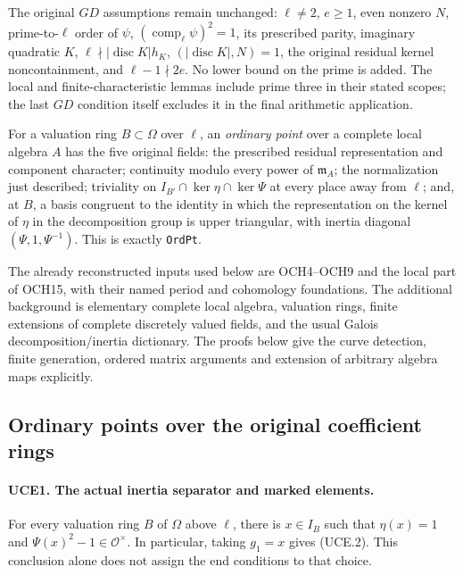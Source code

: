 \documentclass[11pt,a4paper]{article}
\numberwithin{equation}{section}
\theoremstyle{remark}\newtheorem{remark}[theorem]{Remark}
\begin{document}
The original \(GD\) assumptions remain unchanged: \(\ell\ne2\),
\(e\ge1\), even nonzero \(N\), prime-to-\(\ell\) order of
\(\psi\), \((\operatorname{comp}_\ell\psi)^2=1\), its prescribed
parity, imaginary quadratic \(K\),
\(\ell\nmid |\operatorname{disc}K|h_K\),
\((|\operatorname{disc}K|,N)=1\), the original residual kernel
noncontainment, and \(\ell-1\nmid2e\).  No lower bound on the prime
is added.  The local and finite-characteristic lemmas include prime
three in their stated scopes; the last \(GD\) condition itself excludes
it in the final arithmetic application.

For a valuation ring \(B\subset\Omega\) over \(\ell\), an
\emph{ordinary point} over a complete local algebra \(A\) has the
five original fields: the prescribed residual representation and
component character; continuity modulo every power of \(\mathfrak m_A\);
the normalization just described; triviality on
\(I_{B'}\cap\ker\eta\cap\ker\Psi\) at every place away from
\(\ell\); and, at \(B\), a basis congruent to the identity in which
the representation on the kernel of \(\eta\) in the decomposition
group is upper triangular, with inertia diagonal
\((\Psi,1,\Psi^{-1})\).  This is exactly \texttt{Ord\allowbreak Pt}.

The already reconstructed inputs used below are OCH4--OCH9 and the
local part of OCH15, with their named period and cohomology foundations.
The additional background is elementary complete local algebra,
valuation rings, finite extensions of complete discretely valued
fields, and the usual Galois decomposition/inertia dictionary.  The
proofs below give the curve detection, finite generation, ordered
matrix arguments and extension of arbitrary algebra maps explicitly.

\subsection{Ordinary points over the original coefficient rings}

\paragraph{UCE1. The actual inertia separator and marked elements.}
\label{claim:UCE1}
For every valuation ring \(B\) of \(\Omega\) above \(\ell\), there is
\(x\in I_B\) such that
\(\eta(x)=1\) and \(\Psi(x)^2-1\in\mathcal O^\times\).
In particular, taking \(g_1=x\) gives (UCE.2).  This conclusion alone
does not assign the end conditions to that choice.
\end{document}
